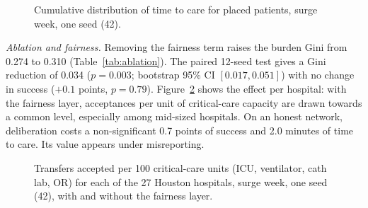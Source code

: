 \begin{figure}[!t]
\centering
{}
\caption{Cumulative distribution of time to care for placed patients, surge week, one seed (42).}
\label{fig:cdf}
\end{figure}

\emph{Ablation and fairness.} Removing the fairness term raises the burden Gini from 0.274 to 0.310 (Table~\ref{tab:ablation}). The paired 12-seed test gives a Gini reduction of 0.034 ($p=0.003$; bootstrap 95\% CI $[0.017,0.051]$) with no change in success ($+0.1$ points, $p=0.79$). Figure~\ref{fig:burden} shows the effect per hospital: with the fairness layer, acceptances per unit of critical-care capacity are drawn towards a common level, especially among mid-sized hospitals. On an honest network, deliberation costs a non-significant 0.7 points of success and 2.0 minutes of time to care. Its value appears under misreporting.

\begin{figure}[!t]
\centering
{}
\caption{Transfers accepted per 100 critical-care units (ICU, ventilator, cath lab, OR) for each of the 27 Houston hospitals, surge week, one seed (42), with and without the fairness layer.}
\label{fig:burden}
\end{figure}

